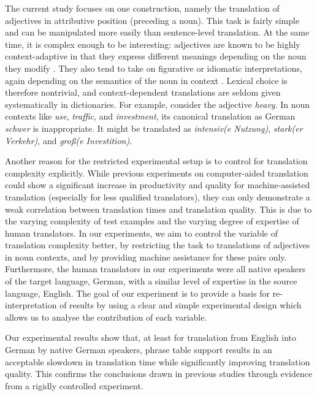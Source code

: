 \documentclass[output=paper]{LSP/langsci}
\begin{document}
The current study focuses on one construction, namely the translation
of adjectives in attributive position (preceding a noun). This task is
fairly simple and can be manipulated more easily than sentence-level
translation. At the same time, it is complex enough to be interesting:
adjectives are known to be highly context-adaptive in that they
express different meanings depending on the noun they modify
\citep{Sapir:1944,JustesonKatz:1993}. They also tend to take on
figurative or idiomatic interpretations, again depending on the
semantics of the noun in context \citep{Miller:1998}. Lexical choice
is therefore nontrivial, and context-dependent translations are seldom
given systematically in dictionaries.  For example, consider the
adjective \textit{heavy}. In noun contexts like \textit{use},
\textit{traffic}, and \textit{investment}, its canonical translation
as German \textit{schwer} is inappropriate. It might be translated as
\textit{intensiv(e Nutzung)}, \textit{stark(er Verkehr)}, and
\textit{groß(e Investition)}.

Another reason for the restricted experimental setup is to control for
translation complexity explicitly. While previous experiments on
computer-aided translation could show a significant increase in
productivity and quality for machine-assisted translation (especially
for less qualified translators), they can only dem\-on\-strate a weak
correlation between translation times and translation quality. This is
due to the varying complexity of test examples and the varying degree
of expertise of human translators. In our experiments, we aim to
control the variable of translation complexity better, by restricting
the task to translations of adjectives in noun contexts, and by
providing machine assistance for these pairs only. Furthermore, the
human translators in our experiments were all native speakers of the
target language, German, with a similar level of expertise in the source
language, English. The goal of our experiment is to provide a basis
for re-interpretation of results by using a clear and simple
experimental design which allows us to analyse the contribution of
each variable.

Our experimental results show that, at least for translation from
English into German by native German speakers, phrase table support
results in an acceptable slowdown in translation time while
significantly improving translation quality. This confirms the
conclusions drawn in previous studies through evidence from a rigidly
controlled experiment.
\end{document}
